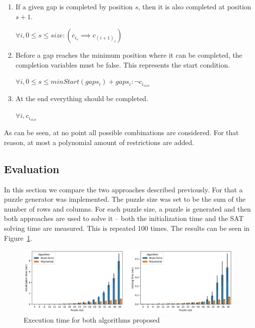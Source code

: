 \documentclass[12pt]{article}
\begin{document}
\begin{enumerate}
  \item If a given gap is completed by position $s$, then it is also completed at position $s+1$.
  \begin{center}
    $\forall i, 0 \le s \le size: (c_i_s \implies c_{(i+1)}_s) $
  \end{center}

  \item Before a gap reaches the minimum position where it can be completed, the completion variables must be false. This represents the start condition.
  \begin{center}
    $\forall i, 0 \le s \le minStart(gaps_i)+gaps_i: \neg c_i_{size}$
  \end{center}

  \item At the end everything should be completed.

  \begin{center}
    $\forall i, c_i_{size}$
  \end{center}
\end{enumerate}

As can be seen, at no point all possible combinations are considered. For that reason, at most a polynomial amount of restrictions are added.

\subsection*{Evaluation}

In this section we compare the two approaches described previously.
For that a puzzle generator was implemented. The puzzle size was set to be the sum of the number of rows and columns. For each puzzle size, a puzzle is generated and then both approaches are used to solve it -- both the initialization time and the SAT solving time are measured. This is repeated 100 times. The results can be seen in Figure~\ref{fig:bench}.

\begin{figure}[H]
  \includegraphics[scale=0.5]{bench.png}
  \centering
  \caption{Execution time for both algorithms proposed}
  \label{fig:bench}
\end{figure}
\end{document}
